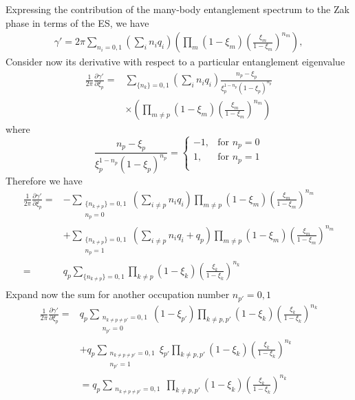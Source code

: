 \documentclass[twocolumn,amsmath,longbibliography,amssymb,superscriptaddress]{revtex4-1}
\begin{document}
Expressing the contribution of the many-body entanglement spectrum to the Zak phase in terms of the ES, we have
\begin{align*}
\gamma' = 2\pi \sum_{n_i = 0,1} \left(\sum_{i } n_i q_i\right) \left(\prod_m (1- \xi_m)\left(\frac{\xi_m}{1-\xi_m} \right)^{n_m} \right) ,
\end{align*} 
Consider now its derivative with respect to a particular entanglement eigenvalue
\begin{align}
\frac{1}{2\pi}\frac{\partial \gamma'}{\partial \xi_p} =& \sum_{\{n_k\}=0,1}\left(\sum_{i } n_i q_i\right)\frac{n_p - \xi_p}{\xi_p^{1-n_p}(1-\xi_p)^{n_p}}\\
&\times \left(\prod_{m\neq p} (1- \xi_m)\left(\frac{\xi_m}{1-\xi_m} \right)^{n_m} \right)
\end{align}
where
\begin{equation}
 \frac{n_p - \xi_p}{\xi_p^{1-n_p}(1-\xi_p)^{n_p}} = 
  \begin{cases}
    -1, & \text{for } n_p=0 \\
    1, & \text{for } n_p = 1 \\
  \end{cases}	
\end{equation}
Therefore we have
\begin{align*}
\frac{1}{2\pi}\frac{\partial \gamma'}{\partial \xi_p} =& -\sum_{\substack{\{n_{k\neq p}\}=0,1 \\ n_p = 0}}\left(\sum_{i \neq p} n_i q_i\right)\prod_{m\neq p} (1-\xi_m)\left( \frac{\xi_m}{1-\xi_m} \right)^{n_m} \\
&+ \sum_{\substack{\{n_{k\neq p}\}=0,1 \\ n_p = 1}}\left(\sum_{i \neq p} n_i q_i +q_p\right) \prod_{m\neq p} (1-\xi_m)\left( \frac{\xi_m}{1-\xi_m} \right)^{n_m} \\
=&q_p\sum_{\{n_{k\neq p}\}=0,1} \prod_{k\neq p} (1-\xi_k)\left( \frac{\xi_k}{1-\xi_k} \right)^{n_k} \\
\end{align*}
Expand now the sum  for another occupation number $n_{p'} = 0,1$ 
\begin{align*}
\frac{1}{2\pi}\frac{\partial \gamma'}{\partial \xi_p} =& q_p\sum_{\substack{n_{k \neq p \neq p'}=0,1\\ n_{p'}= 0}} (1-\xi_{p'})\prod_{k\neq p,p'} (1-\xi_k)\left( \frac{\xi_k}{1-\xi_k} \right)^{n_k} \\
&+ q_p\sum_{\substack{n_{k \neq p \neq p'}=0,1\\ n_{p'}= 1}} \xi_{p'}\prod_{k\neq p,p'} (1-\xi_k)\left( \frac{\xi_k}{1-\xi_k} \right)^{n_k} \\
 &=q_p\sum_{\substack{n_{k \neq p \neq p'}=0,1}} \prod_{k\neq p,p'} (1-\xi_k)\left( \frac{\xi_k}{1-\xi_k} \right)^{n_k} 
\end{align*}
\end{document}
